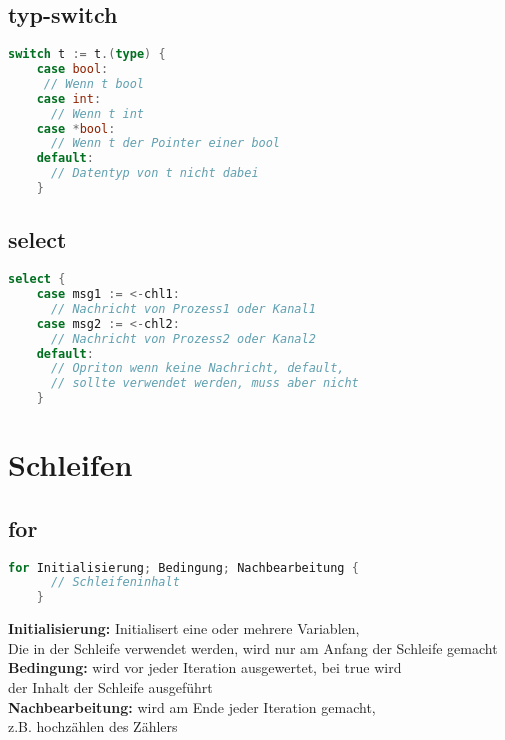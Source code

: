 \documentclass[twoside,a4paper,12pt]{article}
\begin{document}
\subsection{typ-switch}
\begin{center}
  \begin{minipage}{1.0\textwidth}
    \begin{lstlisting}[language=Go]
    switch t := t.(type) {
    case bool:
     // Wenn t bool
    case int:
      // Wenn t int 
    case *bool:
      // Wenn t der Pointer einer bool 
    default: 
      // Datentyp von t nicht dabei
    } 
    \end{lstlisting}
  \end{minipage}
\end{center}

\subsection{select}
\begin{center}
  \begin{minipage}{1.0\textwidth}
    \begin{lstlisting}[language=Go]
    select {
    case msg1 := <-chl1:
      // Nachricht von Prozess1 oder Kanal1 
    case msg2 := <-chl2:
      // Nachricht von Prozess2 oder Kanal2
    default:
      // Opriton wenn keine Nachricht, default, 
      // sollte verwendet werden, muss aber nicht
    }
    \end{lstlisting}
  \end{minipage}
\end{center}

\section{Schleifen}
\subsection{for}
\begin{center}
  \begin{minipage}{1.0\textwidth}
    \begin{lstlisting}[language=Go]
    for Initialisierung; Bedingung; Nachbearbeitung {
      // Schleifeninhalt
    }
    \end{lstlisting}
  \end{minipage}
\end{center}
\textbf{Initialisierung:} Initialisert eine oder mehrere Variablen, \\ 
Die in der Schleife verwendet werden, wird nur am Anfang der Schleife gemacht \\ 
\textbf{Bedingung:} wird vor jeder Iteration ausgewertet, bei true wird \\ 
der Inhalt der Schleife ausgeführt \\ 
\textbf{Nachbearbeitung:} wird am Ende jeder Iteration gemacht, \\ 
z.B. hochzählen des Zählers  
\end{document}

